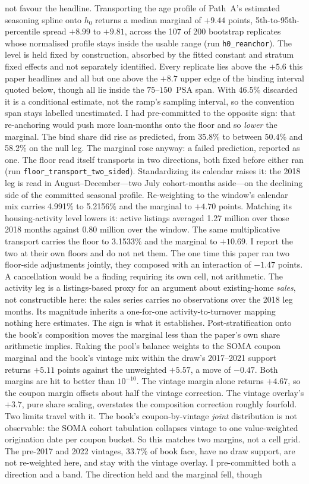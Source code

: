 \documentclass[12pt]{article}
\begin{document}
not favour the headline. Transporting the age profile of Path~A's estimated seasoning spline onto $h_0$ returns a median marginal of $+9.44$ points, 5th-to-95th-percentile spread $+8.99$ to $+9.81$, across the 107 of 200 bootstrap replicates whose normalised profile stays inside the usable range (run \texttt{h0\_reanchor}). The level is held fixed by construction, absorbed by the fitted constant and stratum fixed effects and not separately identified. Every replicate lies above the $+5.6$ this paper headlines and all but one above the $+8.7$ upper edge of the binding interval quoted below, though all lie inside the $75$--$150$~PSA span. With 46.5\% discarded it is a conditional estimate, not the ramp's sampling interval, so the convention span stays labelled unestimated. I had pre-committed to the opposite sign: that re-anchoring would push more loan-months onto the floor and so \emph{lower} the marginal. The bind share did rise as predicted, from 35.8\% to between 50.4\% and 58.2\% on the null leg. The marginal rose anyway: a failed prediction, reported as one. The floor read itself transports in two directions, both fixed before either ran (run \texttt{floor\_transport\_two\_sided}). Standardizing its calendar raises it: the 2018 leg is read in August--December---two July cohort-months aside---on the declining side of the committed seasonal profile. Re-weighting to the window's calendar mix carries 4.991\% to 5.2156\% and the marginal to $+4.70$ points. Matching its housing-activity level lowers it: active listings averaged 1.27 million over those 2018 months against 0.80 million over the window. The same multiplicative transport carries the floor to 3.1533\% and the marginal to $+10.69$. I report the two at their own floors and do not net them. The one time this paper ran two floor-side adjustments jointly, they composed with an interaction of $-1.47$ points. A cancellation would be a finding requiring its own cell, not arithmetic. The activity leg is a listings-based proxy for an argument about existing-home \emph{sales}, not constructible here: the sales series carries no observations over the 2018 leg months. Its magnitude inherits a one-for-one activity-to-turnover mapping nothing here estimates. The sign is what it establishes. Post-stratification onto the book's composition moves the marginal less than the paper's own share arithmetic implies. Raking the pool's balance weights to the SOMA coupon marginal and the book's vintage mix within the draw's 2017--2021 support returns $+5.11$ points against the unweighted $+5.57$, a move of $-0.47$. Both margins are hit to better than $10^{-10}$. The vintage margin alone returns $+4.67$, so the coupon margin offsets about half the vintage correction. The vintage overlay's $+3.7$, pure share scaling, overstates the composition correction roughly fourfold. Two limits travel with it. The book's coupon-by-vintage \emph{joint} distribution is not observable: the SOMA cohort tabulation collapses vintage to one value-weighted origination date per coupon bucket. So this matches two margins, not a cell grid. The pre-2017 and 2022 vintages, 33.7\% of book face, have no draw support, are not re-weighted here, and stay with the vintage overlay. I pre-committed both a direction and a band. The direction held and the marginal fell, though 
\end{document}

